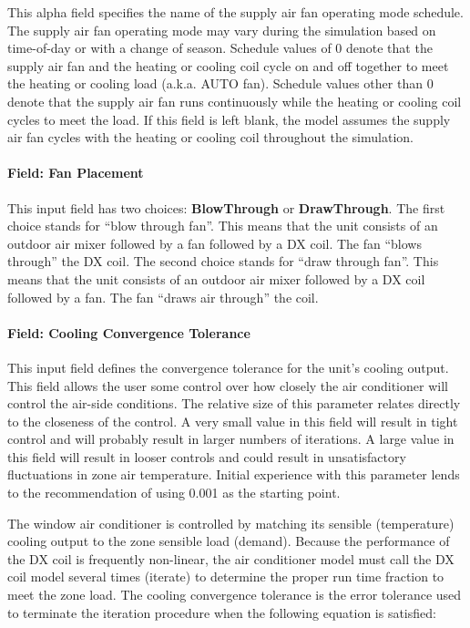 This alpha field specifies the name of the supply air fan operating mode schedule. The supply air fan operating mode may vary during the simulation based on time-of-day or with a change of season. Schedule values of 0 denote that the supply air fan and the heating or cooling coil cycle on and off together to meet the heating or cooling load (a.k.a. AUTO fan). Schedule values other than 0 denote that the supply air fan runs continuously while the heating or cooling coil cycles to meet the load. If this field is left blank, the model assumes the supply air fan cycles with the heating or cooling coil throughout the simulation.

\paragraph{Field: Fan Placement}\label{field-fan-placement-2-000}

This input field has two choices: \textbf{BlowThrough} or \textbf{DrawThrough}. The first choice stands for ``blow through fan''. This means that the unit consists of an outdoor air mixer followed by a fan followed by a DX coil. The fan ``blows through'' the DX coil. The second choice stands for ``draw through fan''. This means that the unit consists of an outdoor air mixer followed by a DX coil followed by a fan. The fan ``draws air through'' the coil.

\paragraph{Field: Cooling Convergence Tolerance}\label{field-cooling-convergence-tolerance-2}

This input field defines the convergence tolerance for the unit's cooling output. This field allows the user some control over how closely the air conditioner will control the air-side conditions. The relative size of this parameter relates directly to the closeness of the control. A very small value in this field will result in tight control and will probably result in larger numbers of iterations. A large value in this field will result in looser controls and could result in unsatisfactory fluctuations in zone air temperature. Initial experience with this parameter lends to the recommendation of using 0.001 as the starting point.

The window air conditioner is controlled by matching its sensible (temperature) cooling output to the zone sensible load (demand). Because the performance of the DX coil is frequently non-linear, the air conditioner model must call the DX coil model several times (iterate) to determine the proper run time fraction to meet the zone load. The cooling convergence tolerance is the error tolerance used to terminate the iteration procedure when the following equation is satisfied:

